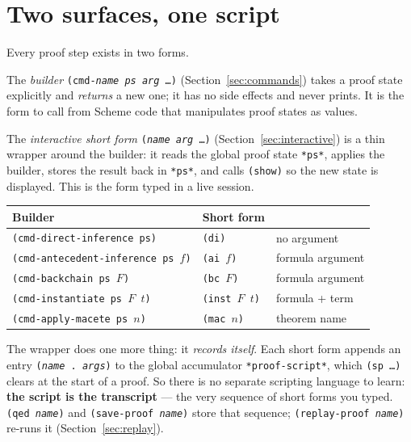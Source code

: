 \section{Two surfaces, one script}
\label{sec:two-surfaces}

Every proof step exists in two forms.

The \emph{builder} \texttt{(cmd-\textit{name}\ \textit{ps}\ \textit{arg}
\ldots)} (Section~\ref{sec:commands}) takes a proof state explicitly and
\emph{returns} a new one; it has no side effects and never prints.  It is
the form to call from Scheme code that manipulates proof states as values.

The \emph{interactive short form} \texttt{(\textit{name}\ \textit{arg}
\ldots)} (Section~\ref{sec:interactive}) is a thin wrapper around the
builder: it reads the global proof state \texttt{*ps*}, applies the
builder, stores the result back in \texttt{*ps*}, and calls \texttt{(show)}
so the new state is displayed.  This is the form typed in a live session.

\begin{center}
\begin{tabular}{@{}lll@{}}
\toprule
Builder & Short form & \\
\midrule
\texttt{(cmd-direct-inference ps)}        & \texttt{(di)}    & no argument \\
\texttt{(cmd-antecedent-inference ps $f$)}& \texttt{(ai $f$)}& formula argument \\
\texttt{(cmd-backchain ps $F$)}           & \texttt{(bc $F$)}& formula argument \\
\texttt{(cmd-instantiate ps $F$ $t$)}     & \texttt{(inst $F$ $t$)} & formula + term \\
\texttt{(cmd-apply-macete ps $n$)}        & \texttt{(mac $n$)} & theorem name \\
\bottomrule
\end{tabular}
\end{center}

\noindent
The wrapper does one more thing: it \emph{records itself}.  Each short form
appends an entry \texttt{(\textit{name}\ .\ \textit{args})} to the global
accumulator \texttt{*proof-script*}, which \texttt{(sp \ldots)} clears at
the start of a proof.  So there is no separate scripting language to learn:
\textbf{the script is the transcript} --- the very sequence of short forms
you typed.  \texttt{(qed \textit{name})} and \texttt{(save-proof
\textit{name})} store that sequence; \texttt{(replay-proof \textit{name})}
re-runs it (Section~\ref{sec:replay}).

